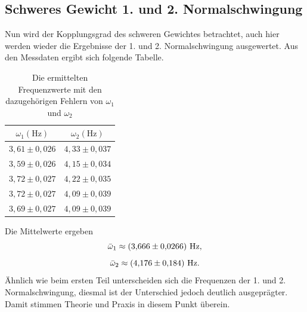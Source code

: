 \subsection*{Schweres Gewicht 1. und 2. Normalschwingung}
Nun wird der Kopplungsgrad des schweren Gewichtes betrachtet, auch hier werden wieder die Ergebnisse der 1. und 2. Normalschwingung ausgewertet. Aus den Messdaten ergibt sich folgende Tabelle.
\begin{table}[H]
    \centering
    \begin{tabular}{c|c}
        $\omega_1 \left(\text{Hz}\right)$ & $\omega_2 \left(\text{Hz}\right)$ \\
        \hline
        $3{,}61 \pm 0{,}026$ & $4{,}33 \pm 0{,}037$ \\
        $3{,}59 \pm 0{,}026$ & $4{,}15 \pm 0{,}034$ \\
        $3{,}72 \pm 0{,}027$ & $4{,}22 \pm 0{,}035$ \\
        $3{,}72 \pm 0{,}027$ & $4{,}09 \pm 0{,}039$ \\
        $3{,}69 \pm 0{,}027$ & $4{,}09 \pm 0{,}039$ \\
    \end{tabular}
    \caption{Die ermittelten Frequenzwerte mit den dazugehörigen Fehlern von $\omega_1$ und $\omega_2$}
\end{table}
Die Mittelwerte ergeben
\begin{equation*}
    \centering
    \bar{\omega}_1 \approx \left(3{,}666 \pm 0{,}0266 \right)\,\text{Hz},
\end{equation*}
\begin{equation*}
    \centering
    \bar{\omega}_2 \approx \left(4{,}176 \pm 0{,}184 \right)\,\text{Hz}.
\end{equation*}
Ähnlich wie beim ersten Teil unterscheiden sich die Frequenzen der 1. und 2. Normalschwingung, diesmal ist der Unterschied jedoch deutlich ausgeprägter. Damit stimmen Theorie und Praxis in diesem Punkt überein.

